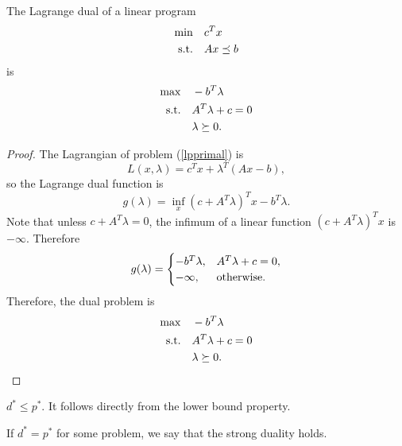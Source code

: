 \documentclass[12pt]{article}
\begin{document}
\begin{example}
    The Lagrange dual of a linear program
    \begin{equation}\label{lpprimal}
        \begin{aligned}
            \min\quad & c^Tx\\
            \textnormal{s.t.}\quad & Ax\preceq b
        \end{aligned}
    \end{equation}
    is
    \begin{equation}\label{lpdual}
        \begin{aligned}
            \max\quad & -b^T\lambda\\
            \textnormal{s.t.}\quad & A^T\lambda+c=0\\
            & \lambda\succeq 0.
        \end{aligned}
    \end{equation}
\end{example}
\begin{proof}
    The Lagrangian of problem (\ref{lpprimal}) is
    \[L(x,\lambda)=c^Tx+\lambda^T(Ax-b),\]
    so the Lagrange dual function is
    \[g(\lambda)=\inf_x\left(c+A^T\lambda\right)^Tx-b^T\lambda.\]
    Note that unless \(c+A^T\lambda=0\), the infimum of a linear function \(\left(c+A^T\lambda\right)^Tx\) is \(-\infty\). Therefore
    \[g(\lambda)=\begin{cases}
        -b^T\lambda,&A^T\lambda+c=0,\\
        -\infty,&\textnormal{otherwise}.
    \end{cases}\]
    Therefore, the dual problem is
    \[\begin{aligned}
        \max\quad & -b^T\lambda \\
        \textnormal{s.t.}\quad & A^T\lambda+c=0\\
        & \lambda\succeq 0.
    \end{aligned}\]
\end{proof}

\begin{theorem}
    \(d^\ast\leqslant p^\ast\). It follows directly from the lower bound property.
\end{theorem}

\begin{definition}
    If \(d^\ast=p^\ast\) for some problem, we say that the \textnormal{strong duality} holds.
\end{definition}
\end{document}
